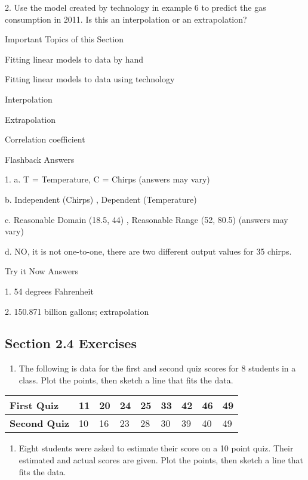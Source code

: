 \begin{enumerate}
2. Use the model created by technology in example 6 to predict the gas
consumption in 2011. Is this an interpolation or an extrapolation?

Important Topics of this Section

Fitting linear models to data by hand

Fitting linear models to data using technology

Interpolation

Extrapolation

Correlation coefficient

Flashback Answers

1. a. T = Temperature, C = Chirps (answers may vary)

b. Independent (Chirps) , Dependent (Temperature)

c. Reasonable Domain (18.5, 44) , Reasonable Range (52, 80.5) (answers
may vary)

d. NO, it is not one-to-one, there are two different output values for
35 chirps.

Try it Now Answers

1. 54 degrees Fahrenheit

2. 150.871 billion gallons; extrapolation

\subsection{Section 2.4 Exercises}\label{section-2.4-exercises}

\begin{enumerate}
\def\labelenumi{\arabic{enumi}.}
\item
  The following is data for the first and second quiz scores for 8
  students in a class. Plot the points, then sketch a line that fits the
  data.
\end{enumerate}

\begin{longtable}[]{@{}lllllllll@{}}
\toprule
\textbf{First Quiz} & 11 & 20 & 24 & 25 & 33 & 42 & 46 &
49\tabularnewline
\midrule
\endhead
\textbf{Second Quiz} & 10 & 16 & 23 & 28 & 30 & 39 & 40 &
49\tabularnewline
\bottomrule
\end{longtable}

\begin{enumerate}
\def\labelenumi{\arabic{enumi}.}
\item
  Eight students were asked to estimate their score on a 10 point quiz.
  Their estimated and actual scores are given. Plot the points, then
  sketch a line that fits the data.
\end{enumerate}


\end{enumerate}
